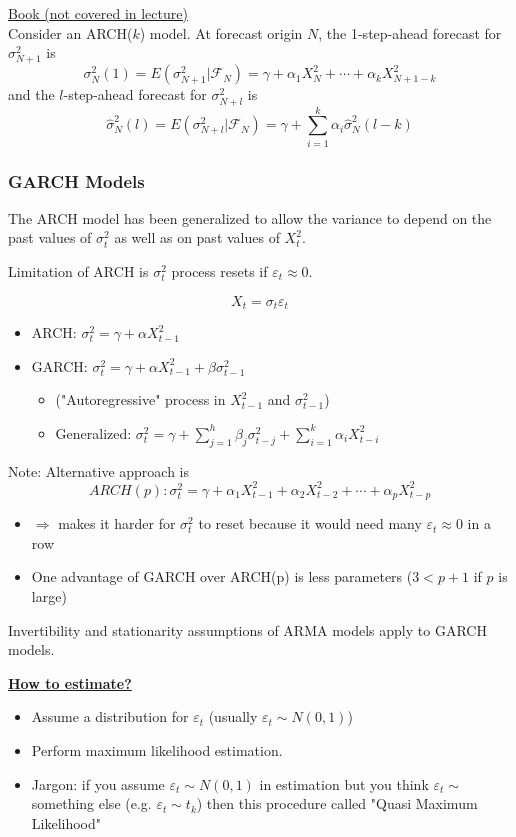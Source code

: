 \noindent
\underline{Book (not covered in lecture)} \\
\noindent
Consider an ARCH($k$) model. At forecast origin $N$, the 1-step-ahead forecast for $\sigma_{N+1}^2$ is \[
\sigma_N^2 (1)=E(\sigma_{N+1}^2| \mathcal{F}_N) = \gamma + \alpha_1 X_N^2 + \cdots + \alpha_k X_{N+1-k}^2
\]
and the $l$-step-ahead forecast for $\sigma_{N+l}^2$ is \[
\hat{\sigma}_N^2(l)= E(\sigma_{N+l}^2| \mathcal{F}_N) = \gamma + \sum_{i=1}^k \alpha_i \hat{\sigma}_N^2 (l-k)
\]

\subsubsection{GARCH Models}
The ARCH model has been generalized to allow the variance to depend on the past values of $\sigma_t^2$ as well as on past values of $X_t^2$.

Limitation of ARCH is $\sigma_t^2$ process resets if $\varepsilon_t \approx0$. 

\[X_t=\sigma_t \varepsilon_t\]
\begin{itemize}
    \item ARCH: $\sigma_t^2=\gamma+\alpha X_{t-1}^2$
    \item GARCH: $\sigma_t^2= \gamma+\alpha X_{t-1}^2 + \beta \sigma_{t-1}^2 $
    \begin{itemize}
        \item[] ("Autoregressive" process in $X_{t-1}^2$ and $\sigma_{t-1}^2$)
        \item Generalized: $\sigma_t^2 =\gamma + \sum_{j=1}^h \beta_j \sigma_{t-j}^2 + \sum_{i=1}^k \alpha_i X_{t-i}^2$
    \end{itemize}
\end{itemize}

Note: Alternative approach is \[ARCH(p): \sigma_t^2 = \gamma +\alpha_1 X_{t-1}^2 + \alpha_2 X_{t-2}^2 + \cdots + \alpha_p X_{t-p}^2\]
\begin{itemize}
    \item[]$\Rightarrow$ makes it harder for $\sigma_t^2$ to reset because it would need many $\varepsilon_t\approx 0$ in a row
    \item One advantage of GARCH over ARCH(p) is less parameters ($3 < p+1$ if $p$ is large)
\end{itemize}

Invertibility and stationarity assumptions of ARMA models apply to GARCH models. 

\textbf{\underline{How to estimate?}}
\begin{itemize}
    \item Assume a distribution for $\varepsilon_t$ (usually $\varepsilon_t \sim N(0,1)$)
    \item Perform maximum likelihood estimation.
    \item Jargon: if you assume $\varepsilon_t \sim N(0,1)$ in estimation but you think $\varepsilon_t \sim $ something else (e.g. $\varepsilon_t \sim t_k$) then this procedure called "Quasi Maximum Likelihood"
\end{itemize}


